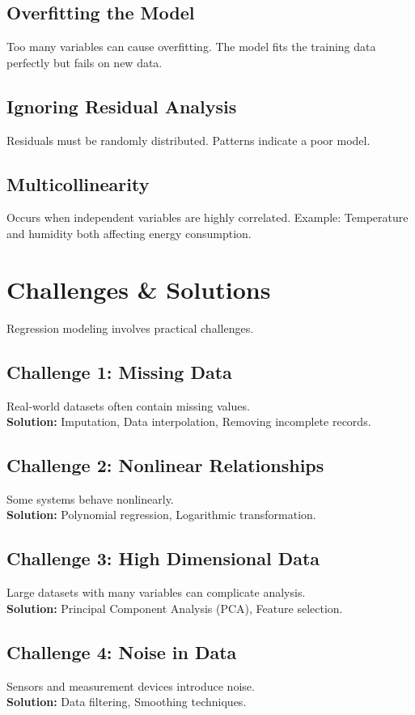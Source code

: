 \documentclass[12pt,a4paper]{article}
\begin{document}
	\subsection{Overfitting the Model}
	Too many variables can cause overfitting. The model fits the training data perfectly but fails on new data.
	
	\subsection{Ignoring Residual Analysis}
	Residuals must be randomly distributed. Patterns indicate a poor model.
	
	\subsection{Multicollinearity}
	Occurs when independent variables are highly correlated. Example: Temperature and humidity both affecting energy consumption.
	
	\section{Challenges \& Solutions}
	Regression modeling involves practical challenges.
	
	\subsection{Challenge 1: Missing Data}
	Real-world datasets often contain missing values.\\
	\textbf{Solution:} Imputation, Data interpolation, Removing incomplete records.
	
	\subsection{Challenge 2: Nonlinear Relationships}
	Some systems behave nonlinearly.\\
	\textbf{Solution:} Polynomial regression, Logarithmic transformation.
	
	\subsection{Challenge 3: High Dimensional Data}
	Large datasets with many variables can complicate analysis.\\
	\textbf{Solution:} Principal Component Analysis (PCA), Feature selection.
	
	\subsection{Challenge 4: Noise in Data}
	Sensors and measurement devices introduce noise.\\
	\textbf{Solution:} Data filtering, Smoothing techniques.
	
\end{document}
